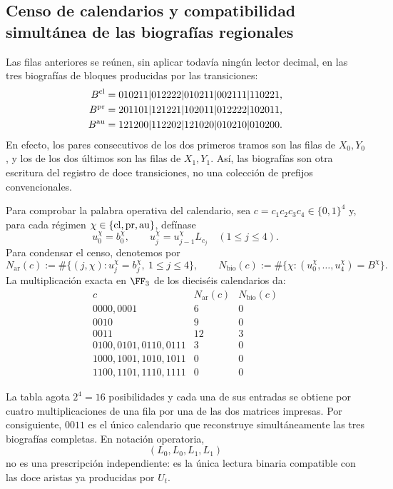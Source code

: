 \subsection{Censo de calendarios y compatibilidad simultánea de las biografías regionales}
Las filas anteriores se reúnen, sin aplicar todavía ningún lector decimal,
en las tres biografías de bloques producidas por las transiciones:
\begin{align}
 B^{\rm cl}
  &=010211|012222|010211|002111|110221,\notag\\
 B^{\rm pr}
  &=201101|121221|102011|012222|102011,
 \label{act21:eq:biografias-tpk-tres-caracteres}\\
 B^{\rm au}
  &=121200|112202|121020|010210|010200.\notag
\end{align}
En efecto, los pares consecutivos de los dos primeros tramos son las filas
de \(X_0,Y_0\), y los de los dos últimos son las filas de \(X_1,Y_1\).
Así, las biografías son otra escritura del registro de doce transiciones, no
una colección de prefijos convencionales.

Para comprobar la palabra operativa del calendario, sea
\(c=c_1c_2c_3c_4\in\{0,1\}^4\) y, para cada régimen
\(\chi\in\{{\rm cl},{\rm pr},{\rm au}\}\), defínase
\[
 u_0^\chi=b_0^\chi,\qquad
 u_j^\chi=u_{j-1}^\chi L_{c_j}\quad(1\le j\le4).
\]
Para condensar el censo, denotemos por
\[
 N_{\mathrm{ar}}(c):=
 \#\{(j,\chi):u_j^\chi=b_j^\chi,\ 1\le j\le4\},\qquad
 N_{\mathrm{bio}}(c):=
 \#\{\chi:(u_0^\chi,\ldots,u_4^\chi)=B^\chi\}.
\]
La multiplicación exacta en \(\FF_3\) de los dieciséis calendarios da:
\[
\begin{array}{c|c|c}
 c&N_{\mathrm{ar}}(c)&N_{\mathrm{bio}}(c)\\ \hline
0000,0001&6&0\\
0010&9&0\\
0011&12&3\\
0100,0101,0110,0111&3&0\\
1000,1001,1010,1011&0&0\\
1100,1101,1110,1111&0&0
\end{array}
\tag{D}
\label{act21:eq:censo-dieciseis-calendarios}
\]
\par\pagebreak %
La tabla agota \(2^4=16\) posibilidades y cada una de sus entradas se obtiene
por cuatro multiplicaciones de una fila por una de las dos matrices impresas.
Por consiguiente, \(0011\) es el único calendario que reconstruye
simultáneamente las tres biografías completas. En notación operatoria,
\begin{equation}
 (L_0,L_0,L_1,L_1)
 \label{act21:eq:calendario-0011-interno}
\end{equation}
no es una prescripción independiente: es la única lectura binaria compatible
con las doce aristas ya producidas por \(U_t\).

